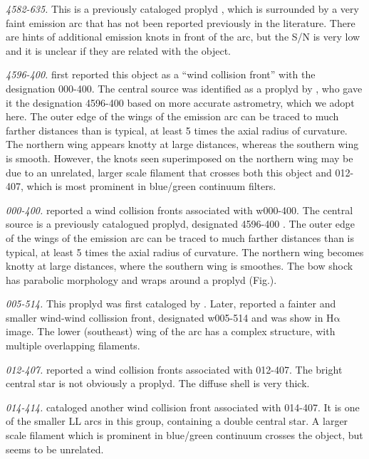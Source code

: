 \documentclass[apj, twocolumn]{aastex63}
\newcommand\ha{\ensuremath{\mathrm{H\alpha}}}
\begin{document}
\textit{4582-635.} This is a previously cataloged proplyd
\citep{Ricci:2008a}, which is surrounded by a very faint emission arc
that has not been reported previously in the literature. There are
hints of additional emission knots in front of the arc, but the S/N is
very low and it is unclear if they are related with the object.

\textit{4596-400.} \citet{Bally:2000a} first reported this object as a
``wind collision front'' with the designation 000-400. The central
source was identified as a proplyd by \citet{Ricci:2008a}, who gave it
the designation 4596-400 based on more accurate astrometry, which we
adopt here. The outer edge of the wings of the emission arc can be
traced to much farther distances than is typical, at least 5 times the
axial radius of curvature. The northern wing appears knotty at large
distances, whereas the southern wing is smooth. However, the knots
seen superimposed on the northern wing may be due to an unrelated,
larger scale filament that crosses both this object and 012-407, which
is most prominent in blue/green continuum filters.

\textit{000-400.} \citet{Bally:2000a} reported a wind collision fronts
associated with w000-400. The central source is a previously catalogued
proplyd, designated 4596-400 \citep{Ricci:2008a}. The outer edge of
the wings of the emission arc can be traced to much farther distances
than is typical, at least 5 times the axial radius of curvature.
The northern wing becomes knotty at large distances, where  the southern
wing is smoothes. The bow shock has parabolic morphology and wraps around
a proplyd (Fig.).   

\textit{005-514.} This proplyd was first cataloged by \citet{ODell:1996a}.
Later, \citet{Bally:2000a} reported a fainter and smaller wind-wind
collission front, designated w005-514 and was show in \ha{} image.
The lower (southeast) wing of the arc has a complex structure, with
multiple overlapping filaments.

\textit{012-407.} \citet{Bally:2000a} reported a wind collision fronts
associated with 012-407. The bright central star is not obviously a
proplyd. The diffuse shell is very thick.  

\textit{014-414.} \citet{Bally:2000a} cataloged another wind collision
front associated with 014-407. It is one of the smaller LL arcs in this
group, containing a double central star. A larger scale filament which
is prominent in blue/green continuum crosses the object, but seems to be
unrelated. 
\end{document}
